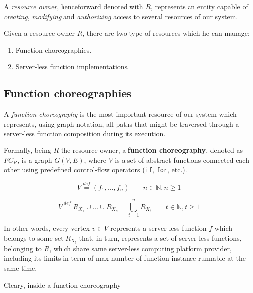 \documentclass[10pt,a4paper]{article}
\newcommand{\mathDef}{\overset{\textit{def}}{=}}
\begin{document}
A \textit{resource owner}, henceforward denoted with $R$, represents an entity capable of \textit{creating}, \textit{modifying} and \textit{authorizing} access to several resources of our system.

Given a resource owner $R$, there are two type of resources which he can manage:

\begin{enumerate}
\item Function choreographies.
\item Server-less function implementations.
\end{enumerate}

\subsection{Function choreographies}

A \textit{function choreography} is the most important resource of our system which  represents, using graph notation, all paths that might be traversed through a server-less function composition during its execution. 

Formally, being $R$ the resource owner, a \textbf{function choreography}, denoted as $FC_R$, is a graph $G(V,E)$, where $V$ is a set of abstract functions connected each other using predefined control-flow operators (\texttt{if}, \texttt{for}, etc.).

\begin{equation}
V \mathDef (f_1, \ldots, f_n) \qquad n \in \mathbb{N}, n \geq 1 
\end{equation}










\begin{equation}
V \mathDef R_{{X}_{1}} \cup  \ldots \cup R_{{X}_{n}} = \bigcup_{t = 1}^n R_{{X}_{t}} \qquad t \in \mathbb{N}, t \geq 1 
\end{equation}

In other words, every vertex $v \in V$ represents a server-less function $f$ which belongs to some set $R_{{X}_{t}}$ that, in turn, represents a set of server-less functions, belonging to $R$, which share same server-less computing platform provider, including its limits in term of max number of function instance runnable at the same time. 



Cleary, inside a function choreography
\end{document}
